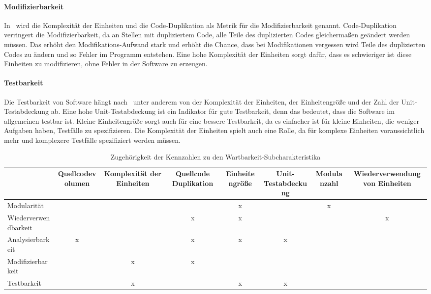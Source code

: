 \documentclass[12pt, a4paper, ngerman]{article}
\begin{document}
\paragraph{Modifizierbarkeit}

In~\cite{maintainability_metrics} wird die Komplexität der Einheiten und die Code-Duplikation
als Metrik für die Modifizierbarkeit genannt.
Code-Duplikation verringert die Modifizierbarkeit, da an Stellen mit dupliziertem Code,
alle Teile des duplizierten Codes gleichermaßen geändert werden müssen.
Das erhöht den Modifikations-Aufwand stark und erhöht die Chance,
dass bei Modifikationen vergessen wird Teile des duplizierten Codes zu ändern und so Fehler im Programm entstehen.
Eine hohe Komplexität der Einheiten sorgt dafür,
dass es schwieriger ist diese Einheiten zu modifizieren, ohne Fehler in der Software zu erzeugen.

\paragraph{Testbarkeit}

Die Testbarkeit von Software hängt nach~\cite{maintainability_metrics} unter anderem von der Komplexität der Einheiten,
der Einheitengröße und der Zahl der Unit-Testabdeckung ab.
Eine hohe Unit-Testabdeckung ist ein Indikator für gute Testbarkeit,
denn das bedeutet, dass die Software im allgemeinen testbar ist.
Kleine Einheitengröße sorgt auch für eine bessere Testbarkeit,
da es einfacher ist für kleine Einheiten, die weniger Aufgaben haben, Testfälle zu spezifizieren.
Die Komplexität der Einheiten spielt auch eine Rolle,
da für komplexe Einheiten voraussichtlich mehr und komplexere Testfälle spezifiziert werden müssen.

\begin{center}
  \begin{table}
    \centering
    \renewcommand{\arraystretch}{1.2}
    \begin{NiceTabular}{|l|c|c|c|c|c|c|c|}
      \hline
      & \rotate Quellcodevolumen
      & \rotate Komplexität der Einheiten
      & \rotate Quellcode Duplikation
      & \rotate Einheitengröße
      & \rotate Unit-Testabdeckung
      & \rotate Modulanzahl
      & \rotate Wiederverwendung von Einheiten \\\hline
      Modularität           & & & &x& &x& \\\hline
      Wiederverwendbarkeit  & & &x&x& & &x\\\hline
      Analysierbarkeit      &x& &x&x&x& & \\\hline
      Modifizierbarkeit     & &x&x& & & & \\\hline
      Testbarkeit           & &x& &x&x& & \\\hline
    \end{NiceTabular}
    \caption{Zugehörigkeit der Kennzahlen zu den Wartbarkeit-Subcharakteristika}
    \label{table:maintainability_metrics}
  \end{table}
\end{center}
\end{document}
